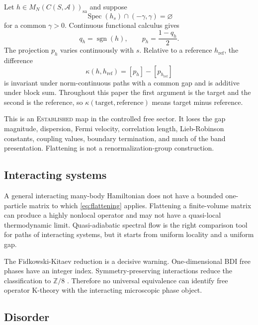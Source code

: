 \documentclass[12pt]{article}
\theoremstyle{definition}
\theoremstyle{remark}
\newcommand{\A}{\mathcal A}
\newcommand{\Spec}{\operatorname{Spec}}
\newcommand{\EST}{\textnormal{\textsc{Established}}}
\begin{document}
Let $h\in M_N(C(S,\A))_{\mathrm{sa}}$ and suppose
\begin{equation}
\Spec(h_s)\cap(-\gamma,\gamma)=\varnothing
\end{equation}
for a common $\gamma>0$.  Continuous functional calculus gives
\begin{equation}
q_h=\operatorname{sgn}(h),
\qquad
p_h=\frac{1-q_h}{2}.
\label{eq:flattening}
\end{equation}
The projection $p_h$ varies continuously with $s$.  Relative to a reference
$h_{\mathrm{ref}}$, the difference
\begin{equation}
\kappa(h,h_{\mathrm{ref}})
=[p_h]-[p_{h_{\mathrm{ref}}}]
\label{eq:k-class}
\end{equation}
is invariant under norm-continuous paths with a common gap and is additive
under block sum.  Throughout this paper the first argument is the target and
the second is the reference, so $\kappa(\text{target},\text{reference})$ means
target minus reference.

This is an \EST{} map in the controlled free sector.  It loses the gap
magnitude, dispersion, Fermi velocity, correlation length, Lieb-Robinson
constants, coupling values, boundary termination, and much of the band
presentation.  Flattening is not a renormalization-group construction.

\subsection{Interacting systems}

A general interacting many-body Hamiltonian does not have a bounded
one-particle matrix to which \cref{eq:flattening} applies.  Flattening a
finite-volume matrix can produce a highly nonlocal operator and may not have
a quasi-local thermodynamic limit.  Quasi-adiabatic spectral flow is the
right comparison tool for paths of interacting systems, but it starts from
uniform locality and a uniform gap.

The Fidkowski-Kitaev reduction is a decisive warning.  One-dimensional BDI
free phases have an integer index.  Symmetry-preserving interactions reduce
the classification to $\mathbb Z/8$ \cite{FidkowskiKitaev2010}.  Therefore no universal equivalence can
identify free operator K-theory with the interacting microscopic phase
object.

\subsection{Disorder}
\end{document}
